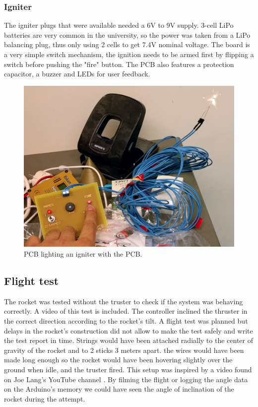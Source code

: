 \subsubsection{Igniter}
The igniter plugs that were available needed a 6V to 9V supply. 3-cell LiPo batteries are very common in the university, so the power was taken from a LiPo balancing plug, thus only using 2 cells to get 7.4V nominal voltage. The board is a very simple switch mechanism, the ignition needs to be armed first by flipping a switch before pushing the "fire" button. The PCB also features a protection capacitor, a buzzer and LEDs for user feedback.

\begin{figure} [h]
	\centering
	\includegraphics[width=0.8\linewidth]{figures/Rocket/implementation/igniter_PCB.png}
	\caption{PCB lighting an igniter with the PCB.}
	\label{fig:igniter_board}
\end{figure}

\subsection{Flight test}
The rocket was tested without the truster to check if the system was behaving correctly. A video of this test is included. The controller inclined the thruster in the correct direction according to the rocket's tilt.
A flight test was planned but delays in the rocket's construction did not allow to make the test safely and write the test report in time.
Strings would have been attached radially to the center of gravity of the rocket and to 2 sticks 3 meters apart. the wires would have been made long enough so the rocket would have been hovering slightly over the ground when idle, and the truster fired. This setup was inspired by a video found on Joe Lang's YouTube channel \cite{web:test_rocket}.
By filming the flight or logging the angle data on the Arduino's memory we could have seen the angle of inclination of the rocket during the attempt.